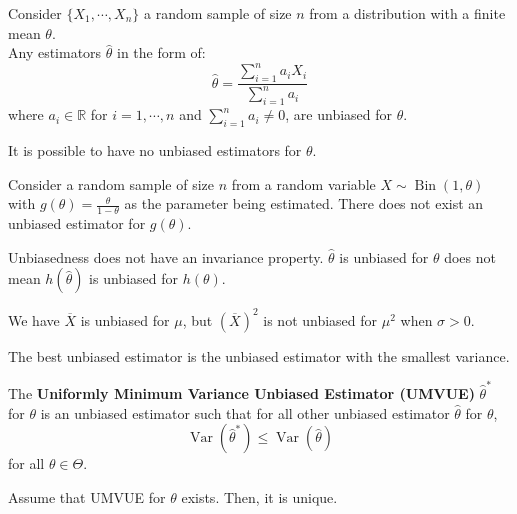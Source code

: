 \documentclass{huhtakm-template-book-v2}
\DeclareMathOperator{\Var}{Var}
\DeclareMathOperator{\Bin}{Bin}
\begin{document}
\begin{eg}
	Consider $\{X_{1},\cdots,X_{n}\}$ a random sample of size $n$ from a distribution with a finite mean $\theta$.\\
	Any estimators $\hat{\theta}$ in the form of:
	\begin{equation*}
		\hat{\theta}=\frac{\sum_{i=1}^{n}a_{i}X_{i}}{\sum_{i=1}^{n}a_{i}}
	\end{equation*}
	where $a_{i}\in\mathbb{R}$ for $i=1,\cdots,n$ and $\sum_{i=1}^{n}a_{i}\neq 0$, are unbiased for $\theta$.
\end{eg}
\begin{rem}
	It is possible to have no unbiased estimators for $\theta$.
\end{rem}
\begin{eg}
	Consider a random sample of size $n$ from a random variable $X\sim\Bin(1,\theta)$ with $g(\theta)=\frac{\theta}{1-\theta}$ as the parameter being estimated. There does not exist an unbiased estimator for $g(\theta)$.
\end{eg}
\begin{rem}
	Unbiasedness does not have an invariance property. $\hat{\theta}$ is unbiased for $\theta$ does not mean $h(\hat{\theta})$ is unbiased for $h(\theta)$.
\end{rem}
\begin{eg}
	We have $\overline{X}$ is unbiased for $\mu$, but $(\overline{X})^{2}$ is not unbiased for $\mu^{2}$ when $\sigma>0$.
\end{eg}
The best unbiased estimator is the unbiased estimator with the smallest variance.
\begin{defn}
	The \textbf{Uniformly Minimum Variance Unbiased Estimator (UMVUE)} $\hat{\theta}^{*}$ for $\theta$ is an unbiased estimator such that for all other unbiased estimator $\hat{\theta}$ for $\theta$,
	\begin{equation*}
		\Var(\hat{\theta}^{*})\leq\Var(\hat{\theta})
	\end{equation*}
	for all $\theta\in\Theta$.
\end{defn}
\begin{lem}
	Assume that UMVUE for $\theta$ exists. Then, it is unique.
\end{lem}
\end{document}

